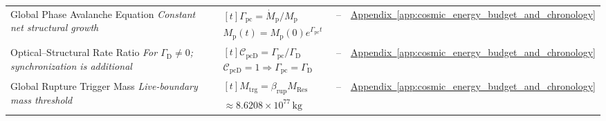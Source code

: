 \begin{longtable}{@{} p{4.5cm} p{6cm} c p{4cm} @{}}
{\raggedright Global Phase Avalanche Equation \newline \textit{Constant net structural growth}\par} & {\raggedright $\begin{gathered}[t]\Gamma_{\mathrm{pc}}=\dot M_{\mathrm p}/M_{\mathrm p} \\ M_{\mathrm p}(t)=M_{\mathrm p}(0)e^{\Gamma_{\mathrm{pc}}t}\end{gathered}$\par} & -- & {\raggedright \hyperref[app:cosmic_energy_budget_and_chronology]{Appendix~\ref*{app:cosmic_energy_budget_and_chronology}}\par} \\

{\raggedright Optical--Structural Rate Ratio \newline \textit{For $\Gamma_{\mathrm D}\ne0$; synchronization is additional}\par} & {\raggedright $\begin{gathered}[t]\mathcal C_{\mathrm{pcD}}=\Gamma_{\mathrm{pc}}/\Gamma_{\mathrm D} \\ \mathcal C_{\mathrm{pcD}}=1\Rightarrow\Gamma_{\mathrm{pc}}=\Gamma_{\mathrm D}\end{gathered}$\par} & -- & {\raggedright \hyperref[app:cosmic_energy_budget_and_chronology]{Appendix~\ref*{app:cosmic_energy_budget_and_chronology}}\par} \\

{\raggedright Global Rupture Trigger Mass \newline \textit{Live-boundary mass threshold}\par} & {\raggedright $\begin{gathered}[t]M_{\mathrm{trg}}=\beta_{\mathrm{rup}}M_{\mathrm{Res}} \\ \approx8.6208\times10^{77}\,\mathrm{kg}\end{gathered}$\par} & -- & {\raggedright \hyperref[app:cosmic_energy_budget_and_chronology]{Appendix~\ref*{app:cosmic_energy_budget_and_chronology}}\par} \\


\end{longtable}
